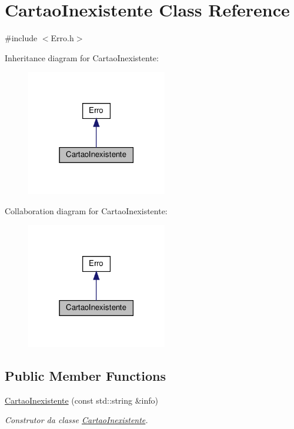 \hypertarget{classCartaoInexistente}{}\section{Cartao\+Inexistente Class Reference}
\label{classCartaoInexistente}


{\ttfamily \#include $<$Erro.\+h$>$}



Inheritance diagram for Cartao\+Inexistente\+:
\nopagebreak
\begin{figure}[H]
\begin{center}
\leavevmode
\includegraphics[width=174pt]{classCartaoInexistente__inherit__graph}
\end{center}
\end{figure}


Collaboration diagram for Cartao\+Inexistente\+:
\nopagebreak
\begin{figure}[H]
\begin{center}
\leavevmode
\includegraphics[width=174pt]{classCartaoInexistente__coll__graph}
\end{center}
\end{figure}
\subsection*{Public Member Functions}
\begin{DoxyCompactItemize}
\item 
\hyperlink{classCartaoInexistente_a48a83d627aabc141aa1bb7216c74918b}{Cartao\+Inexistente} (const std\+::string \&info)
\begin{DoxyCompactList}\small\item\em Construtor da classe \hyperlink{classCartaoInexistente}{Cartao\+Inexistente}. \end{DoxyCompactList}\end{DoxyCompactItemize}


